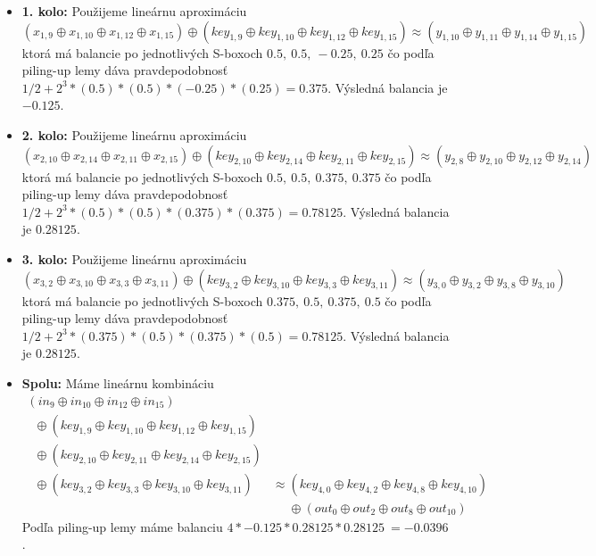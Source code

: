 \begin{itemize}
\item {\bf 1. kolo:}
Použijeme lineárnu aproximáciu
\begin{equation*}
( x_{1,9} \oplus x_{1,10} \oplus x_{1,12} \oplus x_{1,15}  ) 
 \oplus ( key_{1,9} \oplus key_{1,10} \oplus key_{1,12} \oplus key_{1,15} ) 
 \approx ( y_{1,10} \oplus y_{1,11} \oplus y_{1,14} \oplus y_{1,15} )
\end{equation*}
ktorá má balancie po jednotlivých S-boxoch $
0.5,\ 0.5,\ -0.25,\ 0.25
$ čo podľa piling-up lemy dáva pravdepodobnosť 
$1/2 + 2^3*( 0.5)*(0.5)*(-0.25)*(0.25 )= 0.375 $. 
Výsledná balancia je $-0.125$.

\item {\bf 2. kolo:}
Použijeme lineárnu aproximáciu
\begin{equation*}
( x_{2,10} \oplus x_{2,14} \oplus x_{2,11} \oplus x_{2,15}  ) 
 \oplus ( key_{2,10} \oplus key_{2,14} \oplus key_{2,11} \oplus key_{2,15} ) 
 \approx ( y_{2,8} \oplus y_{2,10} \oplus y_{2,12} \oplus y_{2,14} )
\end{equation*}
ktorá má balancie po jednotlivých S-boxoch $
0.5,\ 0.5,\ 0.375,\ 0.375
$ čo podľa piling-up lemy dáva pravdepodobnosť 
$1/2 + 2^3*( 0.5)*(0.5)*(0.375)*(0.375 )= 0.78125 $. 
Výsledná balancia je $0.28125$.

\item {\bf 3. kolo:}
Použijeme lineárnu aproximáciu
\begin{equation*}
( x_{3,2} \oplus x_{3,10} \oplus x_{3,3} \oplus x_{3,11}  ) 
 \oplus ( key_{3,2} \oplus key_{3,10} \oplus key_{3,3} \oplus key_{3,11} ) 
 \approx ( y_{3,0} \oplus y_{3,2} \oplus y_{3,8} \oplus y_{3,10} )
\end{equation*}
ktorá má balancie po jednotlivých S-boxoch $
0.375,\ 0.5,\ 0.375,\ 0.5
$ čo podľa piling-up lemy dáva pravdepodobnosť 
$1/2 + 2^3*( 0.375)*(0.5)*(0.375)*(0.5 )= 0.78125 $. 
Výsledná balancia je $0.28125$.

\item {\bf Spolu:}  Máme lineárnu kombináciu 
\begin{equation*}
\begin{split}
( in_{9} \oplus in_{10} \oplus in_{12} \oplus in_{15} )
 & \\
 \phantom{x} \oplus ( key_{1,9} \oplus key_{1,10} \oplus key_{1,12} \oplus key_{1,15} )
 & \\
 \phantom{x} \oplus ( key_{2,10} \oplus key_{2,11} \oplus key_{2,14} \oplus key_{2,15} )
 & \\
 \phantom{x} \oplus ( key_{3,2} \oplus key_{3,3} \oplus key_{3,10} \oplus key_{3,11} )
 & \approx  (
key_{4,0} \oplus key_{4,2} \oplus key_{4,8} \oplus key_{4,10}
 ) \\
 & \phantom{\approx} \oplus (
out_{0} \oplus out_{2} \oplus out_{8} \oplus out_{10}
) \end{split}
\end{equation*}
Podľa piling-up lemy máme balanciu $4* -0.125*0.28125*0.28125 ~= -0.0396 $.
\end{itemize}
